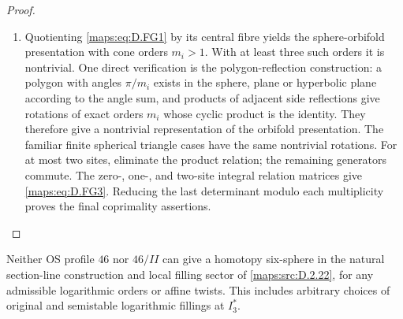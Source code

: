 \begin{proof}
\begin{enumerate}[label=\arabic*.,leftmargin=*]
\item Quotienting \eqref{maps:eq:D.FG1} by its central fibre yields the sphere-orbifold
presentation with cone orders $m_i>1$. With at least three such orders
it is nontrivial. One direct verification is the polygon-reflection
construction: a polygon with angles $\pi/m_i$ exists in the sphere,
plane or hyperbolic plane according to the angle sum, and products of adjacent side reflections give rotations of exact
orders $m_i$ whose cyclic product is the identity. They therefore
give a nontrivial representation of the orbifold presentation. The familiar finite spherical triangle
cases have the same nontrivial rotations. For at most two sites,
eliminate the product relation; the remaining generators commute.
The zero-, one-, and two-site integral relation matrices give \eqref{maps:eq:D.FG3}.
Reducing the last determinant modulo each multiplicity proves the
final coprimality assertions.
\end{enumerate}
\end{proof}

\begin{theorem}\label{maps:src:D.2.24}


Neither OS profile $46$ nor $46/II$ can give a homotopy six-sphere
in the natural section-line construction and local filling sector
of \ref{maps:src:D.2.22}, for any admissible logarithmic orders or affine twists.
This includes arbitrary choices of original and semistable logarithmic
fillings at $I_3^*$.
\end{theorem}


